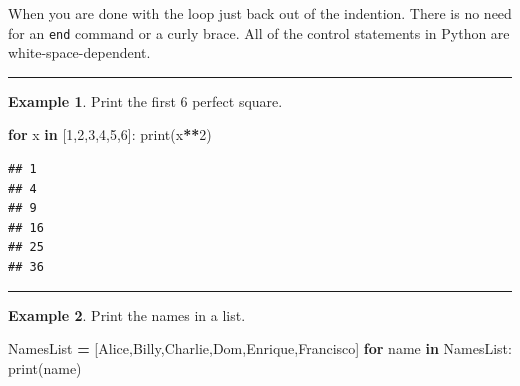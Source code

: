 \documentclass[
]{book}
\newenvironment{Shaded}{\begin{snugshade}}{\end{snugshade}}
\newcommand{\BuiltInTok}[1]{#1}
\newcommand{\ControlFlowTok}[1]{\textcolor[rgb]{0.13,0.29,0.53}{\textbf{#1}}}
\newcommand{\DecValTok}[1]{\textcolor[rgb]{0.00,0.00,0.81}{#1}}
\newcommand{\KeywordTok}[1]{\textcolor[rgb]{0.13,0.29,0.53}{\textbf{#1}}}
\newcommand{\NormalTok}[1]{#1}
\newcommand{\OperatorTok}[1]{\textcolor[rgb]{0.81,0.36,0.00}{\textbf{#1}}}
\newcommand{\StringTok}[1]{\textcolor[rgb]{0.31,0.60,0.02}{#1}}
\theoremstyle{definition}
\theoremstyle{definition}
\newtheorem{example}{Example}[chapter]
\theoremstyle{definition}
\theoremstyle{remark}
\begin{document}
When you are done with the loop just back out of the indention. There is no need for an \texttt{end} command or a curly brace. All of the control statements in Python are white-space-dependent.

\begin{center}\rule{0.5\linewidth}{0.5pt}\end{center}

\begin{example}
\protect\hypertarget{exm:unnamed-chunk-655}{}{\label{exm:unnamed-chunk-655} }Print the first 6 perfect square.
\end{example}

\begin{Shaded}
\begin{Highlighting}[]
\ControlFlowTok{for}\NormalTok{ x }\KeywordTok{in}\NormalTok{ [}\DecValTok{1}\NormalTok{,}\DecValTok{2}\NormalTok{,}\DecValTok{3}\NormalTok{,}\DecValTok{4}\NormalTok{,}\DecValTok{5}\NormalTok{,}\DecValTok{6}\NormalTok{]:}
    \BuiltInTok{print}\NormalTok{(x}\OperatorTok{**}\DecValTok{2}\NormalTok{)}
\end{Highlighting}
\end{Shaded}

\begin{verbatim}
## 1
## 4
## 9
## 16
## 25
## 36
\end{verbatim}

\begin{center}\rule{0.5\linewidth}{0.5pt}\end{center}

\begin{example}
\protect\hypertarget{exm:unnamed-chunk-657}{}{\label{exm:unnamed-chunk-657} }Print the names in a list.
\end{example}

\begin{Shaded}
\begin{Highlighting}[]
\NormalTok{NamesList }\OperatorTok{=}\NormalTok{ [}\StringTok{\textquotesingle{}Alice\textquotesingle{}}\NormalTok{,}\StringTok{\textquotesingle{}Billy\textquotesingle{}}\NormalTok{,}\StringTok{\textquotesingle{}Charlie\textquotesingle{}}\NormalTok{,}\StringTok{\textquotesingle{}Dom\textquotesingle{}}\NormalTok{,}\StringTok{\textquotesingle{}Enrique\textquotesingle{}}\NormalTok{,}\StringTok{\textquotesingle{}Francisco\textquotesingle{}}\NormalTok{]}
\ControlFlowTok{for}\NormalTok{ name }\KeywordTok{in}\NormalTok{ NamesList:}
    \BuiltInTok{print}\NormalTok{(name)}
\end{Highlighting}
\end{Shaded}
\end{document}
